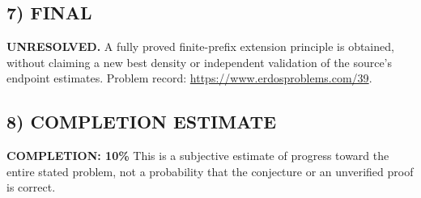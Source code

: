 \subsection*{7) FINAL}
\textbf{UNRESOLVED.} A fully proved finite-prefix extension principle is obtained, without claiming a new best density or independent validation of the source's endpoint estimates.
\noindent Problem record: \url{https://www.erdosproblems.com/39}.

\subsection*{8) COMPLETION ESTIMATE}
\textbf{COMPLETION: 10\%}
This is a subjective estimate of progress toward the entire stated problem, not a probability that the conjecture or an unverified proof is correct.
